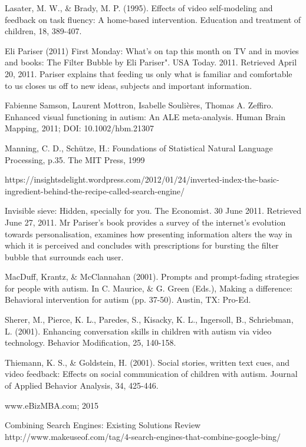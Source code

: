 \documentclass[10pt]{article}
\begin{document}
\begin{thebibliography}{100}
Lasater, M. W., \& Brady, M. P. (1995). Effects of video self-modeling and feedback on task fluency: A home-based intervention. Education and treatment of children, 18, 389-407.


Eli Pariser (2011) First Monday: What's on tap this month on TV and in movies and books: The Filter Bubble by Eli Pariser". USA Today. 2011. Retrieved April 20, 2011. Pariser explains that feeding us only what is familiar and comfortable to us closes us off to new ideas, subjects and important information.

Fabienne Samson, Laurent Mottron, Isabelle Soulières, Thomas A. Zeffiro. Enhanced visual functioning in autism: An ALE meta-analysis. Human Brain Mapping, 2011; DOI: 10.1002/hbm.21307

Manning, C. D., Schütze, H.: Foundations of Statistical Natural Language Processing, p.35. The MIT Press, 1999

https://insightsdelight.wordpress.com/2012/01/24/inverted-index-the-basic-ingredient-behind-the-recipe-called-search-engine/

 Invisible sieve: Hidden, specially for you. The Economist. 30 June 2011. Retrieved June 27, 2011. Mr Pariser’s book provides a survey of the internet’s evolution towards personalisation, examines how presenting information alters the way in which it is perceived and concludes with prescriptions for bursting the filter bubble that surrounds each user.

 MacDuff, Krantz, \& McClannahan (2001). Prompts and prompt-fading strategies for people with autism. In C. Maurice, \& G. Green (Eds.), Making a difference: Behavioral intervention for autism (pp. 37-50). Austin, TX: Pro-Ed.


Sherer, M., Pierce, K. L., Paredes, S., Kisacky, K. L., Ingersoll, B., Schriebman, L. (2001). Enhancing conversation skills in children with autism via video technology. Behavior Modification, 25, 140-158.


Thiemann, K. S., \& Goldstein, H. (2001). Social stories, written text cues, and video feedback: Effects on social communication of children with autism. Journal of Applied Behavior Analysis, 34, 425-446.

www.eBizMBA.com; 2015

Combining Search Engines: Existing Solutions Review
http://www.makeuseof.com/tag/4-search-engines-that-combine-google-bing/



\end{thebibliography}
\end{document}
